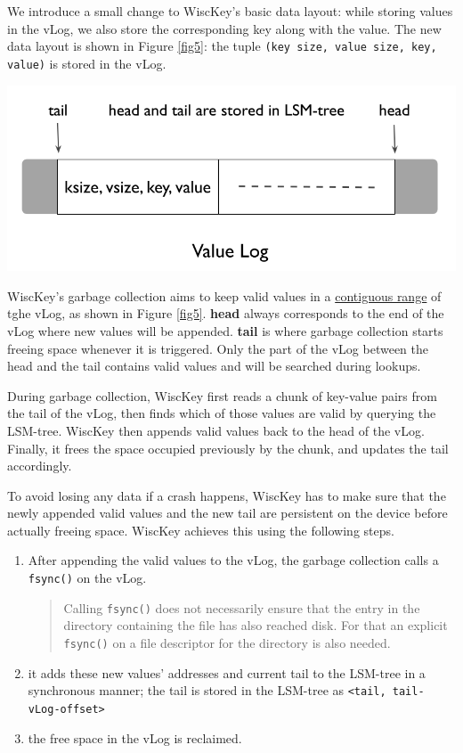 \documentclass[11pt]{article}
\begin{document}
We introduce a small change to WiscKey’s basic data layout: while storing values in the vLog, we also
store the corresponding key along with the value. The new data layout is shown in Figure \ref{fig5}: the
tuple \texttt{(key size, value size, key, value)} is stored in the vLog.

\begin{center}
\includegraphics[width=.7\textwidth]{../../images/db/16.png}
\end{center}

WiscKey's garbage collection aims to keep valid values in a \uline{contiguous range} of tghe vLog, as shown in
Figure \ref{fig5}. \textbf{head} always corresponds to the end of the vLog where new values will be appended.
\textbf{tail} is where garbage collection starts freeing space whenever it is triggered. Only the part of the
vLog between the head and the tail contains valid values and will be searched during lookups.

During garbage collection, WiscKey first reads a chunk of key-value pairs from the tail of the vLog,
then finds which of those values are valid by querying the LSM-tree. WiscKey then appends valid values
back to the head of the vLog. Finally, it frees the space occupied previously by the chunk, and
updates the tail accordingly.

To avoid losing any data if a crash happens, WiscKey has to make sure that the newly appended valid
values and the new tail are persistent on the device before actually freeing space. WiscKey achieves
this using the following steps.
\begin{enumerate}
\item After appending the valid values to the vLog, the garbage collection calls a \texttt{fsync()} on the vLog.
\begin{quote}
Calling \texttt{fsync()} does not necessarily ensure that the entry in the
directory containing the file has also reached disk.  For that an
explicit \texttt{fsync()} on a file descriptor for the directory is also needed.
\end{quote}
\item it adds these new values' addresses and current tail to the LSM-tree in a synchronous manner; the
tail is stored in the LSM-tree as \texttt{<tail, tail-vLog-offset>}
\item the free space in the vLog is reclaimed.
\end{enumerate}
\end{document}
